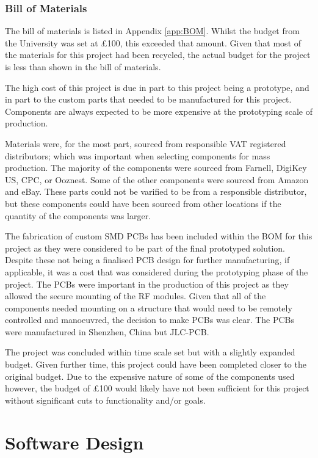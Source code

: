 \documentclass [11pt]{article}
\begin{document}
\subsubsection{Bill of Materials}

The bill of materials is listed in Appendix \ref{app:BOM}. Whilst the budget from the University was set at £100, this exceeded that amount. Given that most of the materials for this project had been recycled, the actual budget for the project is less than shown in the bill of materials.

The high cost of this project is due in part to this project being a prototype, and in part to the custom parts that needed to be manufactured for this project. Components are always expected to be more expensive at the prototyping scale of production.

Materials were, for the most part, sourced from responsible VAT registered distributors; which was important when selecting components for mass production. The majority of the components were sourced from Farnell, DigiKey US, CPC, or Ooznest. Some of the other components were sourced from Amazon and eBay. These parts could not be varified to be from a responsible distributor, but these components could have been sourced from other locations if the quantity of the components was larger. 

The fabrication of custom SMD PCBs has been included within the BOM for this project as they were considered to be part of the final prototyped solution. Despite these not being a finalised PCB design for further manufacturing, if applicable, it was a cost that was considered during the prototyping phase of the project. The PCBs were important in the production of this project as they allowed the secure mounting of the RF modules. Given that all of the components needed mounting on a structure that would need to be remotely controlled and manoeuvred, the decision to make PCBs was clear. The PCBs were manufactured in Shenzhen, China but JLC-PCB.

The project was concluded within time scale set but with a slightly expanded budget. Given further time, this project could have been completed closer to the original budget. Due to the expensive nature of some of the components used however, the budget of £100 would likely have not been sufficient for this project without significant cuts to functionality and/or goals.


\section{Software Design}
\end{document}
